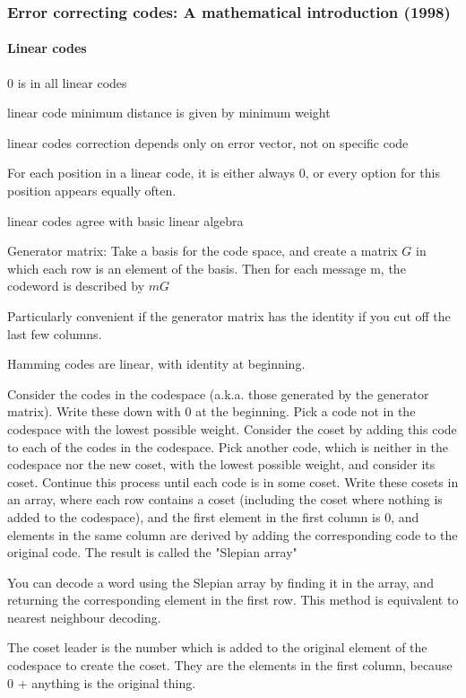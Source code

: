 \documentclass{article}
\begin{document}
\subsubsection{Error correcting codes: A  mathematical introduction (1998)}

\paragraph{Linear codes}

0 is in all linear codes

linear code minimum distance is given by minimum weight

linear codes correction depends only on error vector, not on  specific code

For each position in a linear code, it is either always 0, or every option for this position appears equally often.

linear codes agree with basic linear algebra

Generator matrix: Take a basis for the code space, and create a matrix $G$ in which each row is an element of the basis. Then for each message m, the codeword is described by $m G$

Particularly convenient if the generator matrix has the identity if you cut off the last few columns.

Hamming codes are linear, with identity at beginning.

Consider the codes in the codespace (a.k.a. those generated by the generator matrix). Write these down with 0 at the beginning. Pick a code not in the codespace with the lowest possible weight. Consider the coset by adding this code to each of the codes in the codespace. Pick another code, which is neither in the codespace nor the new coset, with the lowest possible weight, and consider its coset. Continue this process until each code is in some coset. Write these cosets in an array, where each row contains a coset (including the coset where nothing is added to the codespace), and the first element in the first column is 0, and elements in the same column are derived by adding the corresponding code to the original code. The result is called the "Slepian array"

You can decode a word using the Slepian array by finding it in the array, and returning the corresponding element in the first row. This method is equivalent to nearest neighbour decoding.

The coset leader is the number which is added to the original element of the codespace to create the coset. They are the elements in the first column, because 0 + anything is the original thing.
\end{document}
